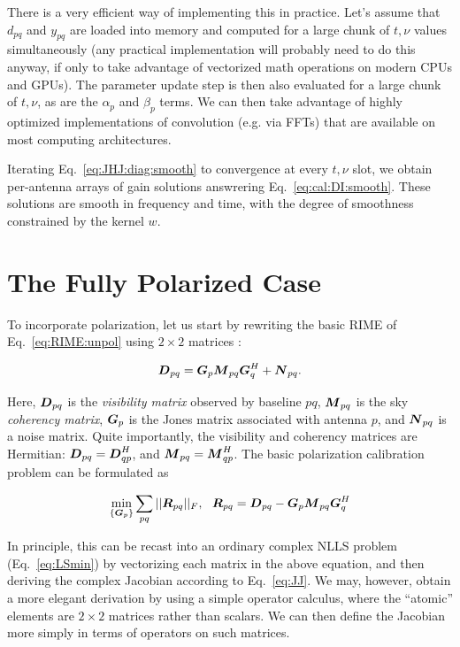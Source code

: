\documentclass[useAMS,usenatbib]{mn2e}
\newcommand{\mat}[1]{{\bmath{#1}}}
\newcommand{\DD}{\mat{D}}
\newcommand{\MM}{\mat{M}}
\newcommand{\RR}{\mat{R}}
\newcommand{\GG}{\mat{G}}
\begin{document}
There is a very efficient way of implementing this in practice. Let's assume that $d_{pq}$ and $y_{pq}$ are loaded into memory 
and computed for a large chunk of $t,\nu$ values simultaneously (any practical implementation will probably need to do this anyway, 
if only to take advantage of vectorized math operations on modern CPUs and GPUs). The parameter update step is then also evaluated
for a large chunk of $t,\nu$, as are the $\alpha_p$ and $\beta_p$ terms. We can then take advantage of highly optimized 
implementations of convolution (e.g. via FFTs) that are available on most computing architectures. 

Iterating Eq.~\ref{eq:JHJ:diag:smooth} to convergence at every $t,\nu$ slot, we obtain per-antenna arrays of gain solutions 
answrering Eq.~\ref{eq:cal:DI:smooth}. These solutions are smooth in frequency and time, with the degree of smoothness 
constrained by the kernel $w$. 

\section{The Fully Polarized Case}
\label{sec:pol}

To incorporate polarization, let us start by rewriting the basic RIME of Eq.~\ref{eq:RIME:unpol} using $2\times 2$ matrices \citep[a full derivation
may be found in][]{RRIME1}:

\begin{equation}
\label{eq:RIME:pol}
\DD_{pq} = \GG_p \MM_{pq} \GG^H_q + \mat{N}_{pq}.
\end{equation}

Here, $\DD_{pq}$ is the \emph{visibility matrix} observed by baseline $pq$, $\MM_{pq}$ is the sky \emph{coherency matrix}, $\GG_p$ is the Jones matrix associated with antenna $p$, and $\mat{N}_{pq}$ is a noise matrix. Quite importantly, the visibility and coherency matrices are Hermitian: 
$\DD_{pq}=\DD^H_{qp}$, and $\MM_{pq}=\MM^H_{qp}$. The basic polarization calibration problem can be formulated as

\begin{equation}
\label{eq:cal:DI:pol}
\min_{\{\GG_p\}}\sum_{pq}||\RR_{pq}||_F,~~
\RR_{pq} = \DD_{pq}-\GG_p \MM_{pq} \GG^H_q
\end{equation}


\newcommand{\Rop}[1]{\mathcal{R}_{{#1}}}
\newcommand{\Lop}[1]{\mathcal{L}_{{#1}}}
\newcommand{\Top}{\mathcal{T}}

In principle, this can be recast into an ordinary complex NLLS problem (Eq.~\ref{eq:LSmin}) by vectorizing each 
matrix in the above equation,  and then deriving the complex Jacobian according to Eq.~\ref{eq:JJ}. We may, however, 
obtain a more elegant derivation by using a simple operator calculus, where the ``atomic'' elements are $2\times2$ matrices 
rather than scalars. We can then define the Jacobian more simply in terms of operators on such matrices. 
\end{document}
